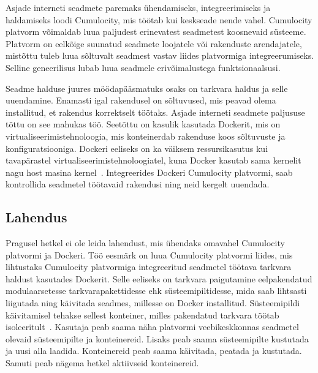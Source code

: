 \documentclass[12pt]{article}
\begin{document}
  Asjade interneti seadmete paremaks ühendamiseks, integreerimiseks ja haldamiseks loodi
  Cumulocity, mis töötab kui keskseade nende vahel. Cumulocity platvorm võimaldab luua
  paljudest erinevatest seadmetest koosnevaid süsteeme. Platvorm on eelkõige suunatud
  seadmete loojatele või rakenduste arendajatele, mistõttu tuleb luua sõltuvalt seadmest
  vastav liides platvormiga integreerumiseks. Selline geneerilisus lubab luua
  seadmele erivõimalustega funktsionaalsusi.

  Seadme halduse juures möödapääsmatuks osaks on tarkvara haldus ja selle uuendamine.
  Enamasti igal rakendusel on sõltuvused, mis peavad olema installitud, et rakendus
  korrektselt töötaks. Asjade interneti seadmete paljususe tõttu on see mahukas töö.
  Seetõttu on kasulik kasutada Dockerit, mis on virtualiseerimistehnoloogia, mis
  konteinerdab rakenduse koos sõltuvuste ja konfiguratsiooniga.
  Dockeri eeliseks on ka väiksem ressursikasutus kui tavapärastel
  virtualiseerimistehnoloogiatel, kuna Docker kasutab sama kernelit nagu host masina
  kernel~\cite{DockerDocOverview}.
  Integreerides
  Dockeri Cumulocity platvormi, saab kontrollida seadmetel töötavaid rakendusi
  ning neid kergelt uuendada.
  






  \subsection{Lahendus}
  Pragusel hetkel ei ole leida lahendust, mis ühendaks omavahel Cumulocity platvormi
  ja Dockeri. Töö eesmärk on luua Cumulocity platvormi liides, mis lihtustaks Cumulocity platvormiga
  integreeritud seadmetel töötava tarkvara
  haldust kasutades Dockerit. Selle eeliseks on tarkvara paigutamine eelpakendatud
  modulaarsetesse tarkvarapakettidesse ehk süsteemipiltidesse, mida saab lihtsasti liigutada
  ning käivitada seadmes, millesse on Docker installitud. Süsteemipildi
  käivitamisel tehakse sellest konteiner, milles pakendatud tarkvara töötab
  isoleeritult~\cite{DockerDocOverview}.
  Kasutaja peab saama näha platvormi veebikeskkonnas seadmetel
  olevaid süsteemipilte ja konteinereid. Lisaks peab saama süsteemipilte kustutada ja uusi
  alla laadida. Konteinereid peab saama käivitada, peatada ja kustutada. Samuti peab nägema
  hetkel aktiivseid konteinereid.
\end{document}
